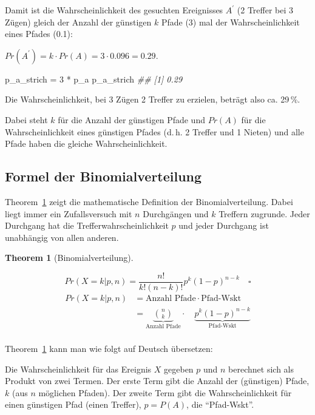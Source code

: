 \documentclass[
  ngerman,
  letterpaper,
  twoside,
  open=any]{scrbook}
\newenvironment{Shaded}{\begin{snugshade}}{\end{snugshade}}
\newcommand{\DecValTok}[1]{\textcolor[rgb]{0.68,0.00,0.00}{#1}}
\newcommand{\DocumentationTok}[1]{\textcolor[rgb]{0.37,0.37,0.37}{\textit{#1}}}
\newcommand{\NormalTok}[1]{\textcolor[rgb]{0.00,0.23,0.31}{#1}}
\newcommand{\OtherTok}[1]{\textcolor[rgb]{0.00,0.23,0.31}{#1}}
\newcommand{\SpecialCharTok}[1]{\textcolor[rgb]{0.37,0.37,0.37}{#1}}
\theoremstyle{definition}
\theoremstyle{plain}
\newtheorem{theorem}{Theorem}[chapter]
\theoremstyle{definition}
\theoremstyle{definition}
\theoremstyle{definition}
\theoremstyle{definition}
\theoremstyle{remark}
\begin{document}
Damit ist die Wahrscheinlichkeit des gesuchten Ereignisses
\(A^{\prime}\) (2 Treffer bei 3 Zügen) gleich der Anzahl der günstigen
\(k\) Pfade (3) mal der Wahrscheinlichkeit eines Pfades (0.1):

\(Pr(A^{\prime}) = k \cdot Pr(A) = 3 \cdot 0.096 = 0.29\).

\begin{Shaded}
\begin{Highlighting}[]
\NormalTok{p\_a\_strich }\OtherTok{=} \DecValTok{3} \SpecialCharTok{*}\NormalTok{ p\_a}
\NormalTok{p\_a\_strich}
\DocumentationTok{\#\# [1] 0.29}
\end{Highlighting}
\end{Shaded}

Die Wahrscheinlichkeit, bei 3 Zügen 2 Treffer zu erzielen, beträgt also
ca. 29\,\%.

Dabei steht \(k\) für die Anzahl der günstigen Pfade und \(Pr(A)\) für
die Wahrscheinlichkeit eines günstigen Pfades (d.\,h. 2 Treffer und 1
Nieten) und alle Pfade haben die gleiche Wahrscheinlichkeit.

\subsection{Formel der
Binomialverteilung}\label{formel-der-binomialverteilung}

Theorem~\ref{thm-binomial} zeigt die mathematische Definition der
Binomialverteilung. Dabei liegt immer ein Zufallsversuch mit \(n\)
Durchgängen und \(k\) Treffern zugrunde. Jeder Durchgang hat die
Trefferwahrscheinlichkeit \(p\) und jeder Durchgang ist unabhängig von
allen anderen.

\begin{theorem}[Binomialverteilung]\protect\hypertarget{thm-binomial}{}\label{thm-binomial}

\[Pr(X=k|p,n) = \frac{n!}{k!(n-k)!}p^k(1-p)^{n-k}\quad \square\]
\[\begin{aligned}
Pr(X=k|p,n) &= \text{Anzahl Pfade} \cdot \text{Pfad-Wskt} \\
&= \underbrace{\binom{n}{k} }_{\text{Anzahl Pfade}} \cdot \quad \underbrace{p^k(1-p)^{n-k}}_{\text{Pfad-Wskt}} \\
\end{aligned}\]

\end{theorem}

Theorem~\ref{thm-binomial} kann man wie folgt auf Deutsch übersetzen:

\begin{displayquote}
Die Wahrscheinlichkeit für das Ereignis \(X\) gegeben \(p\) und \(n\)
berechnet sich als Produkt von zwei Termen. Der erste Term gibt die
Anzahl der (günstigen) Pfade, \(k\) (aus \(n\) möglichen Pfaden). Der
zweite Term gibt die Wahrscheinlichkeit für einen günstigen Pfad (einen
Treffer), \(p=P(A)\), die \enquote{Pfad-Wskt}.
\end{displayquote}
\end{document}
